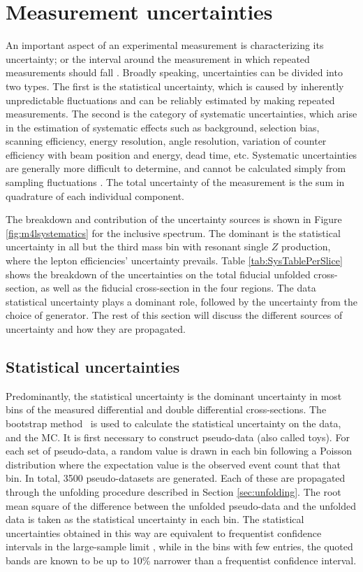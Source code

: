 \section{Measurement uncertainties}
\label{sec:uncertainties}
An important aspect of an experimental measurement is characterizing its uncertainty; or the interval around the measurement in which repeated measurements should fall \cite{Kar:ab1be6}. Broadly speaking, uncertainties can be divided into two types. The first is the statistical uncertainty, which is caused by inherently unpredictable fluctuations and can be reliably estimated by making repeated measurements. The second is the category of systematic uncertainties, which arise in the estimation of systematic effects such as background, selection bias, scanning efficiency, energy resolution, angle resolution, variation of counter efficiency with beam position and energy, dead time, etc\cite{orear}. Systematic uncertainties are generally more difficult to determine, and cannot be calculated simply from sampling fluctuations \cite{reygers}. The total uncertainty of the measurement is the sum in quadrature of each individual component.

The breakdown and contribution of the uncertainty sources is shown in Figure \ref{fig:m4lsystematics} for the inclusive \mFourL spectrum. The dominant is the statistical uncertainty in all but the third mass bin with resonant single $Z$ production, where the lepton efficiencies' uncertainty prevails. Table \ref{tab:SysTablePerSlice} shows the breakdown of the uncertainties on the total fiducial unfolded cross-section, as well as the fiducial cross-section in the four \mFourL regions. The data statistical uncertainty plays a dominant role, followed by the uncertainty from the choice of generator. The rest of this section will discuss the different sources of uncertainty and how they are propagated.

\subsection{Statistical uncertainties} \label{ssec:statuncert}

Predominantly, the statistical uncertainty is the dominant uncertainty in most bins of the measured differential and double differential cross-sections. The bootstrap method~\cite{ATLAS_Bootstrap_2021} is used to calculate the statistical uncertainty on the data, and the MC. It is first necessary to construct pseudo-data (also called toys). For each set of pseudo-data, a random value is drawn in each bin following a Poisson distribution where the expectation value is the observed event count that that bin. In total, 3500 pseudo-datasets are generated. Each of these are propagated through the unfolding procedure described in Section \ref{sec:unfolding}. The root mean square of the difference between the unfolded pseudo-data and the unfolded data is taken as the statistical uncertainty in each bin. The statistical uncertainties obtained in this way are equivalent to frequentist confidence intervals in the large-sample limit  , while in the bins with few entries, the quoted bands are known to be up to 10\% narrower than a frequentist confidence interval.

